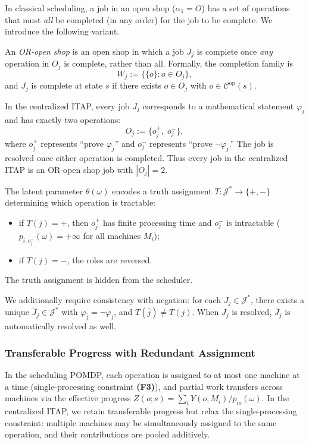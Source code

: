 In classical scheduling, a job in an open shop ($\alpha_1 = O$) has a set of operations that must \emph{all} be completed (in any
order) for the job to be complete. We introduce the following variant.

\begin{definition}\label{def:oropenshop}
An \emph{OR-open shop} is an open shop in which a job $J_j$ is complete once
\emph{any} operation in $O_j$ is complete, rather than all. Formally, the completion
family is
\[
W_j := \bigl\{\{o\} : o \in O_j\bigr\},
\]
and $J_j$ is complete at state $s$ if there exists $o \in O_j$ with
$o \in \mathcal{C}^{\mathrm{op}}(s)$.
\end{definition}

In the centralized ITAP, every job $J_j$ corresponds to a mathematical statement
$\varphi_j$ and has exactly two operations:
\[
O_j := \{o_j^+,\; o_j^-\},
\]
where $o_j^+$ represents ``prove $\varphi_j$'' and $o_j^-$ represents ``prove
$\neg\varphi_j$.'' The job is resolved once either operation is completed. Thus every
job in the centralized ITAP is an OR-open shop job with $|O_j| = 2$.

The latent parameter $\theta(\omega)$ encodes a truth assignment
$T : \mathcal{J}^* \to \{+, -\}$ determining which operation is tractable:
\begin{itemize}
    \item if $T(j) = +$, then $o_j^+$ has finite processing time and $o_j^-$ is
    intractable ($p_{i,o_j^-}(\omega) = +\infty$ for all machines $M_i$);
    \item if $T(j) = -$, the roles are reversed.
\end{itemize}
The truth assignment is hidden from the scheduler.

We additionally require consistency with negation: for each $J_j \in \mathcal{J}^*$,
there exists a unique $\bar J_j \in \mathcal{J}^*$ with
$\varphi_{\bar j} = \neg\varphi_j$, and $T(\bar j) \neq T(j)$.
When $J_j$ is resolved, $\bar J_j$ is automatically resolved as well.

\subsubsection{Transferable Progress with Redundant Assignment}

In the scheduling POMDP, each operation is assigned to at most one machine at a time
(single-processing constraint \textbf{(F3)}), and partial work transfers across
machines via the effective progress $Z(o; s) = \sum_i Y(o, M_i)/p_{io}(\omega)$. In
the centralized ITAP, we retain transferable progress but relax the single-processing
constraint: multiple machines may be simultaneously assigned to the same operation,
and their contributions are pooled additively.

